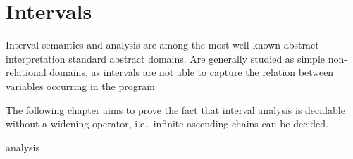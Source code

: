 \chapter{Intervals}

Interval semantics and analysis are among the most well known abstract
interpretation standard abstract domains. Are generally studied as
simple non-relational domains, as intervals are not able to capture
the relation between variables occurring in the program

The following chapter aims to prove the fact that interval analysis is
decidable without a widening operator, i.e., infinite ascending chains
can be decided.

{analysis}
